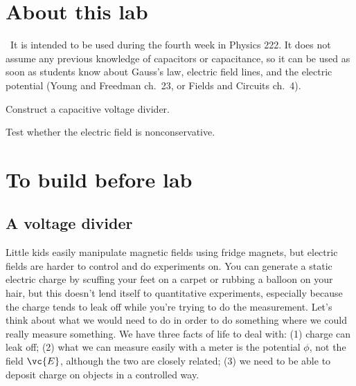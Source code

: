 \renewcommand\thechapter{c2.4}
\label{lab:electric-field}

\section*{About this lab}

\covid\ 
It is intended to be used during the fourth week in Physics 222.
It does not assume any previous knowledge of capacitors or
capacitance, so it can be used as soon as students know about
Gauss's law, electric field lines, and the electric potential
(Young and Freedman ch.~23, or Fields and Circuits ch.~4).

\apparatus
{}

\begin{goals}

\item[] Construct a capacitive voltage divider.

\item[] Test whether the electric field is nonconservative.

\end{goals}

\section*{To build before lab}
\makebanana

\introduction

\subsection*{A voltage divider}

Little kids easily manipulate magnetic fields using fridge magnets,
but electric fields are harder to control and do experiments on.
You can generate a static electric charge by scuffing your feet on
a carpet or rubbing a balloon on your hair, but this doesn't lend itself
to quantitative experiments, especially because the charge tends to
leak off while you're trying to do the measurement. Let's think about
what we would need to do in order to do something where we could really
measure something. We have three facts of life to deal with: (1) charge
can leak off; (2) what we can measure easily with a meter is the
potential $\phi$, not the field $\vc{E}$, although the two are closely
related; (3) we need to be able to deposit charge on objects in a controlled way.

